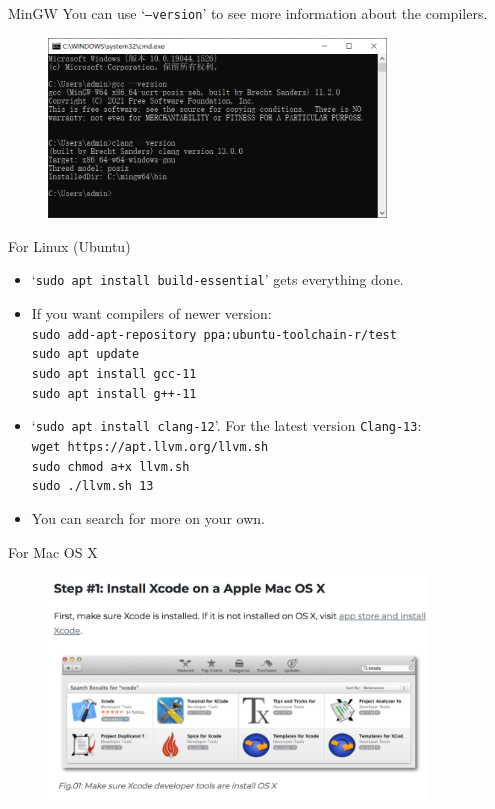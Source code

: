 \documentclass[handout]{beamer}
\begin{document}
\begin{frame}{MinGW}
    You can use `\texttt{--version}' to see more information about the compilers.
    \begin{figure}[h]
        \centering
        \includegraphics[width=0.8\textwidth]{figures/compiler_versions.png}
    \end{figure}
\end{frame}

\begin{frame}{For Linux (Ubuntu)}
    \begin{itemize}
        \item `\texttt{sudo apt install build-essential}' gets everything done.
        \item If you want compilers of newer version:\\
        \texttt{sudo add-apt-repository ppa:ubuntu-toolchain-r/test}\\
        \texttt{sudo apt update}\\
        \texttt{sudo apt install gcc-11}\\
        \texttt{sudo apt install g++-11}
        \item `\texttt{sudo apt install clang-12}'. For the latest version \texttt{Clang-13}:\\
        \texttt{wget https://apt.llvm.org/llvm.sh}\\
        \texttt{sudo chmod a+x llvm.sh}\\
        \texttt{sudo ./llvm.sh 13}
        \item You can search for more on your own.
    \end{itemize}
\end{frame}

\begin{frame}{For Mac OS X}
    \begin{figure}[h]
        \centering
        \includegraphics[width=0.9\textwidth]{figures/install_xcode.png}
    \end{figure}
\end{frame}
\end{document}
